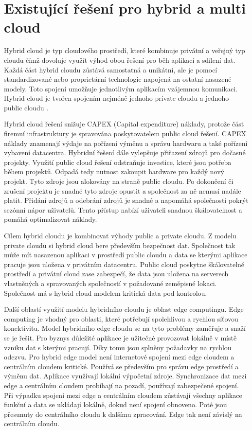 \chapter{Existující řešení pro hybrid a multi cloud}
Hybrid cloud je typ cloudového prostředí, které kombinuje privátní a veřejný typ \linebreak cloudu čímž dovoluje využít výhod obou řešení pro běh aplikací a sdílení dat. Každá část hybrid cloudu zůstává samostatná a unikátní, ale je pomocí standardizované nebo proprietární technologie napojená na ostatní nasazené modely. Toto spojení umožňuje jednotlivým aplikacím vzájemnou komunikaci. Hybrid cloud je tvořen spojením nejméně jednoho private cloudu a jednoho public cloudu \cite{goyal2014public}. \par
    Hybrid cloud řešení snižuje CAPEX (Capital expenditure) náklady, protože část \linebreak firemní infrastruktury je spravována poskytovatelem public cloud řešení. CAPEX náklady znamenají výdaje na pořízení výměnu a správu hardwaru a také pořízení vybavení datacentra. Hybridní řešení dále vylepšuje přiřazení zdrojů pro dočasné projekty. Využití public cloud řešení odstraňuje investice, které jsou potřeba během projektů. Odpadá tedy nutnost zakoupit hardware pro každý nový projekt. Tyto zdroje jsou alokovány na straně public cloudu. Po dokončení či zrušení projektu je snadné tyto zdroje opustit a společnost za ně nemusí nadále platit. Přidání zdrojů a odebrání zdrojů je snadné a napomáhá společnosti pokrýt sezónní nápor uživatelů. Tento přístup nabízí uživateli snadnou škálovatelnost a pomáhá optimalizovat náklady. \par
        Cílem hybrid cloudu je kombinovat výhody public a private cloudu. Z modelu private cloudu si hybrid cloud bere především bezpečnost dat. Společnost tak může mít nasazenou aplikaci v prostředí public cloudu a data se kterými aplikace pracuje jsou uložena v privátním datacentru. Public cloud poskytne škálovatelné prostředí a privátní cloud zase zabezpečí, že data jsou uložena na serverech vlastněných a spravovaných společností v požadované zeměpisné lokaci. Společnost má s hybrid cloud modelem kritická data pod kontrolou. \par
	Další oblastí využití modelu hybridního cloudu je oblast edge computingu. Edge computing je vhodný pro oblasti, které potřebují spolehlivou a rychlou síťovou konektivitu. Model hybridního edge cloudu se na tyto problémy zaměřuje a snaží se je řešit. Pro byznys důležité aplikace je užitečné provozovat lokálně v místě vzniku dat s kterými pracují. Díky tomu jsou splněny požadavky na rychlou odezvu. Pro hybrid edge model není internetové spojení mezi edge cloudem a centrálním cloudem kritické. Používá se především pro správu edge prostředí a výměnu dat. Aplikace využívají lokální výpočetní zdroje. Synchronizace dat mezi edge a centrálním cloudem probíhají na pozadí, používají zabezpečené spojení. Při výpadku spojení mezi edge a centrálním cloudem zůstávají všechny aplikace funkční a data se ukládají lokálně, dokud není spojení obnoveno. Poté jsou přesunuty do centrálního cloudu k dalšímu zpracování. Edge tak není závislý na centrálním cloudu.\par
